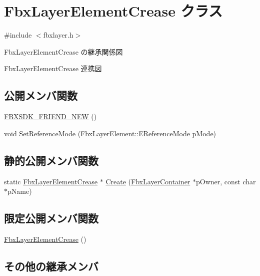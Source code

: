 \hypertarget{class_fbx_layer_element_crease}{}\section{Fbx\+Layer\+Element\+Crease クラス}
\label{class_fbx_layer_element_crease}


{\ttfamily \#include $<$fbxlayer.\+h$>$}



Fbx\+Layer\+Element\+Crease の継承関係図


Fbx\+Layer\+Element\+Crease 連携図
\subsection*{公開メンバ関数}
\begin{DoxyCompactItemize}
\item 
\hyperlink{class_fbx_layer_element_crease_a5b85454e2b22d8349a2134d00e7bdaea}{F\+B\+X\+S\+D\+K\+\_\+\+F\+R\+I\+E\+N\+D\+\_\+\+N\+EW} ()
\item 
void \hyperlink{class_fbx_layer_element_crease_aa670c1f3cfbcef29d1080b6c9c4e8e34}{Set\+Reference\+Mode} (\hyperlink{class_fbx_layer_element_a00f04654580ca9b2f5d292c11abd83fc}{Fbx\+Layer\+Element\+::\+E\+Reference\+Mode} p\+Mode)
\end{DoxyCompactItemize}
\subsection*{静的公開メンバ関数}
\begin{DoxyCompactItemize}
\item 
static \hyperlink{class_fbx_layer_element_crease}{Fbx\+Layer\+Element\+Crease} $\ast$ \hyperlink{class_fbx_layer_element_crease_a658cc8d2e86ed9c86663e6afc72d229c}{Create} (\hyperlink{class_fbx_layer_container}{Fbx\+Layer\+Container} $\ast$p\+Owner, const char $\ast$p\+Name)
\end{DoxyCompactItemize}
\subsection*{限定公開メンバ関数}
\begin{DoxyCompactItemize}
\item 
\hyperlink{class_fbx_layer_element_crease_a7dc7dd72a8045344bd1502dcc4fbf728}{Fbx\+Layer\+Element\+Crease} ()
\end{DoxyCompactItemize}
\subsection*{その他の継承メンバ}


